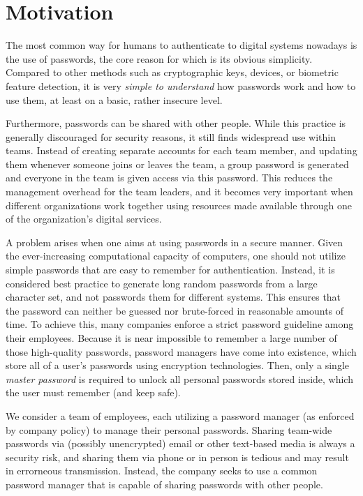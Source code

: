 \section{Motivation}


The most common way for humans to authenticate to digital systems nowadays is
the use of passwords, the core reason for which is its obvious simplicity.
Compared to other methods such as cryptographic keys, devices, or biometric
feature detection, it is very \emph{simple to understand} how passwords work
and how to use them, at least on a basic, rather insecure level.

Furthermore, passwords can be shared with other people. While this practice is
generally discouraged for security reasons, it still finds widespread use
within teams. Instead of creating separate accounts for each team member, and
updating them whenever someone joins or leaves the team, a group password is
generated and everyone in the team is given access via this password. This
reduces the management overhead for the team leaders, and it becomes very
important when different organizations work together using resources made
available through one of the organization's digital services.


A problem arises when one aims at using passwords in a secure manner.  Given
the ever-increasing computational capacity of computers, one should not utilize
simple passwords that are easy to remember for authentication. Instead, it is
considered best practice to generate long random passwords from a large
character set, and not passwords them for different systems. This ensures that
the password can neither be guessed nor brute-forced in reasonable amounts of
time. To achieve this, many companies enforce a strict password guideline among
their employees. Because it is near impossible to remember a large number of
those high-quality passwords, password managers have come into existence, which
store all of a user's passwords using encryption technologies. Then, only a
single \emph{master password} is required to unlock all personal passwords
stored inside, which the user must remember (and keep safe).

We consider a team of employees, each utilizing a password manager (as enforced
by company policy) to manage their personal passwords. Sharing team-wide
passwords via (possibly unencrypted) email or other text-based media is always
a security risk, and sharing them via phone or in person is tedious and may
result in errorneous transmission. Instead, the company seeks to use a common
password manager that is capable of sharing passwords with other people.

